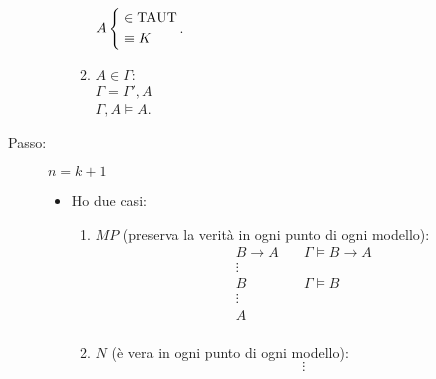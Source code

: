 \documentclass[a4paper,12pt]{article}
\newcommand{\latinmodern}[1]{\text{#1}}
\newcommand{\latinmath}[1]{\text{\latinmodern{#1}}} %
\begin{document}
\begin{dimo}
\begin{description}
\begin{itemize}
\begin{enumerate}
				                  $A \left\{\begin{aligned}
						                   & \in \latinmath{TAUT} \\
						                   & \equiv K
					                  \end{aligned}\right.$.
				                  \vspace{4pt}
				            \item $A \in \Gamma$: \\
				                  $\Gamma = \Gamma', A$ \\
				                  $\Gamma, A \vDash A$.
			            \end{enumerate}
		      \end{itemize}
		\item [Passo:] $n=k+1$
		      \begin{itemize}
			      \item Ho due casi:
			            \begin{enumerate}
				            \item $M \! P$ (preserva la verità in ogni punto di ogni modello):
				                  \vspace*{-8pt}
				                  $$\begin{array}{cl}
						                  B \to A & \quad \Gamma \vDash B \to A \\
						                  \vdots  &                             \\
						                  B       & \quad \Gamma \vDash B       \\
						                  \vdots  &                             \\
						                  A       &                             \\
					                  \end{array}$$
				                  \vspace*{-16pt}
				            \item $N$ (è vera in ogni punto di ogni modello):
				                  \vspace*{-8pt}
				                  $$\vdots$$
				                  \vspace*{-30pt}
				                  \begin{mathpar}
				                  \end{mathpar}
			            \end{enumerate}
		      \end{itemize}
	\end{description}
\end{dimo}
\end{document}
